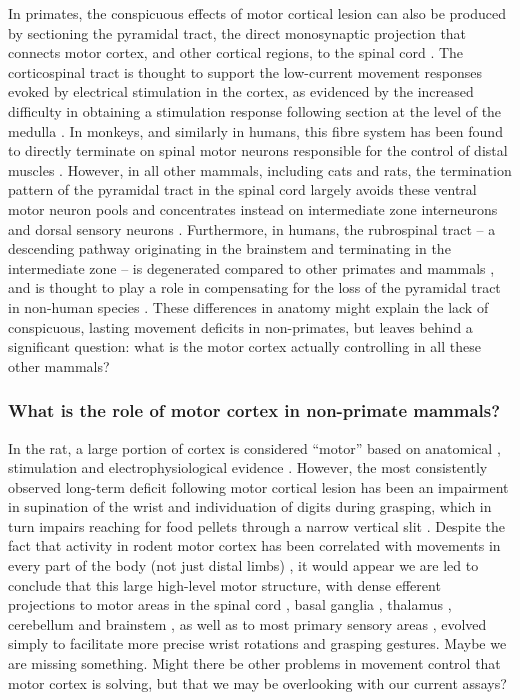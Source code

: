 In primates, the conspicuous effects of motor cortical lesion can also be produced by sectioning the pyramidal tract, the direct monosynaptic projection that connects motor cortex, and other cortical regions, to the spinal cord \cite{Tower1940,Lawrence1968}. The corticospinal tract is thought to support the low-current movement responses evoked by electrical stimulation in the cortex, as evidenced by the increased difficulty in obtaining a stimulation response following section at the level of the medulla \cite{Woolsey1972}. In monkeys, and similarly in humans, this fibre system has been found to directly terminate on spinal motor neurons responsible for the control of distal muscles \cite{Leyton1917,Bernhard1954}. However, in all other mammals, including cats and rats, the termination pattern of the pyramidal tract in the spinal cord largely avoids these ventral motor neuron pools and concentrates instead on intermediate zone interneurons and dorsal sensory neurons \cite{Kuypers1981,Yang2003}. Furthermore, in humans, the rubrospinal tract -- a descending pathway originating in the brainstem and terminating in the intermediate zone -- is degenerated compared to other primates and mammals \cite{Square1982}, and is thought to play a role in compensating for the loss of the pyramidal tract in non-human species \cite{Lawrence1968a,Zaaimi2012}. These differences in anatomy might explain the lack of conspicuous, lasting movement deficits in non-primates, but leaves behind a significant question: what is the motor cortex actually controlling in all these other mammals?

\subsubsection*{What is the role of motor cortex in non-primate mammals?}

In the rat, a large portion of cortex is considered ``motor'' based on anatomical \cite{Donoghue1982}, stimulation \cite{Donoghue1982,Neafsey1986} and electrophysiological evidence \cite{Hyland1998}. However, the most consistently observed long-term deficit following motor cortical lesion has been an impairment in supination of the wrist and individuation of digits during grasping, which in turn impairs reaching for food pellets through a narrow vertical slit \cite{Whishaw1991,Alaverdashvili2008a}. Despite the fact that activity in rodent motor cortex has been correlated with movements in every part of the body (not just distal limbs) \cite{Hill2011,Erlich2011}, it would appear we are led to conclude that this large high-level motor structure, with dense efferent projections to motor areas in the spinal cord \cite{Kuypers1981}, basal ganglia \cite{Turner2000,Wu2009}, thalamus \cite{Lee2008}, cerebellum \cite{Baker2001} and brainstem \cite{Jarratt1999}, as well as to most primary sensory areas \cite{Petreanu2012,Schneider2014}, evolved simply to facilitate more precise wrist rotations and grasping gestures. Maybe we are missing something. Might there be other problems in movement control that motor cortex is solving, but that we may be overlooking with our current assays?

